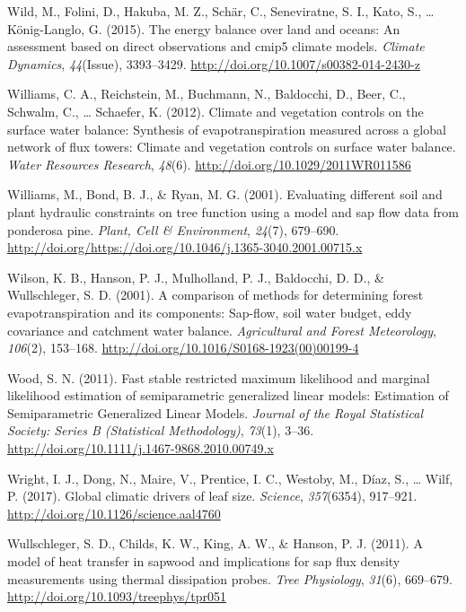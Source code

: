 \documentclass[11pt,twoside]{reedthesis}
\begin{document}
\hypertarget{ref-Wild2015}{}
Wild, M., Folini, D., Hakuba, M. Z., Schär, C., Seneviratne, S. I.,
Kato, S., \ldots{} König-Langlo, G. (2015). The energy balance over land
and oceans: An assessment based on direct observations and cmip5 climate
models. \emph{Climate Dynamics}, \emph{44}(Issue), 3393--3429.
\url{http://doi.org/10.1007/s00382-014-2430-z}

\hypertarget{ref-williams_climate_2012}{}
Williams, C. A., Reichstein, M., Buchmann, N., Baldocchi, D., Beer, C.,
Schwalm, C., \ldots{} Schaefer, K. (2012). Climate and vegetation
controls on the surface water balance: Synthesis of evapotranspiration
measured across a global network of flux towers: Climate and vegetation
controls on surface water balance. \emph{Water Resources Research},
\emph{48}(6). \url{http://doi.org/10.1029/2011WR011586}

\hypertarget{ref-Williams2001}{}
Williams, M., Bond, B. J., \& Ryan, M. G. (2001). Evaluating different
soil and plant hydraulic constraints on tree function using a model and
sap flow data from ponderosa pine. \emph{Plant, Cell \& Environment},
\emph{24}(7), 679--690.
\url{http://doi.org/https://doi.org/10.1046/j.1365-3040.2001.00715.x}

\hypertarget{ref-Wilson2001}{}
Wilson, K. B., Hanson, P. J., Mulholland, P. J., Baldocchi, D. D., \&
Wullschleger, S. D. (2001). A comparison of methods for determining
forest evapotranspiration and its components: Sap-flow, soil water
budget, eddy covariance and catchment water balance. \emph{Agricultural
and Forest Meteorology}, \emph{106}(2), 153--168.
\url{http://doi.org/10.1016/S0168-1923(00)00199-4}

\hypertarget{ref-wood_fast_2011}{}
Wood, S. N. (2011). Fast stable restricted maximum likelihood and
marginal likelihood estimation of semiparametric generalized linear
models: Estimation of Semiparametric Generalized Linear Models.
\emph{Journal of the Royal Statistical Society: Series B (Statistical
Methodology)}, \emph{73}(1), 3--36.
\url{http://doi.org/10.1111/j.1467-9868.2010.00749.x}

\hypertarget{ref-wright_global_2017}{}
Wright, I. J., Dong, N., Maire, V., Prentice, I. C., Westoby, M., Díaz,
S., \ldots{} Wilf, P. (2017). Global climatic drivers of leaf size.
\emph{Science}, \emph{357}(6354), 917--921.
\url{http://doi.org/10.1126/science.aal4760}

\hypertarget{ref-Wullschleger2011}{}
Wullschleger, S. D., Childs, K. W., King, A. W., \& Hanson, P. J.
(2011). A model of heat transfer in sapwood and implications for sap
flux density measurements using thermal dissipation probes. \emph{Tree
Physiology}, \emph{31}(6), 669--679.
\url{http://doi.org/10.1093/treephys/tpr051}
\end{document}
